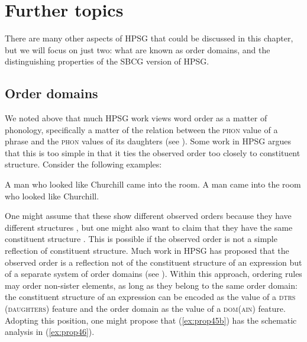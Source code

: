 \documentclass[output=paper
	        ,collection
	        ,collectionchapter
 	        ,biblatex
                ,babelshorthands
                ,newtxmath
                ,draftmode
                ,colorlinks, citecolor=brown
]{langscibook}
\begin{document}
\section{Further topics}\label{sec:prop7}
\label{prop:sec-further-topics}

There are many other aspects of HPSG that could be discussed in this chapter, but we will focus on just two: what are known as order domains, and the distinguishing properties of the SBCG version of HPSG.

\subsection{Order domains}\label{sec:prop7.1}

We noted above that much HPSG work views word order as a matter of phonology, specifically a matter of the relation between the \textsc{phon} value of a phrase and the \textsc{phon} values of its daughters (see ). Some work in HPSG argues that this is too simple in that it ties the observed order too closely to constituent structure. Consider the following examples:

\eal\label{ex:prop45}
\ex\label{ex:prop45a}
A man who looked like Churchill came into the room.
\ex\label{ex:prop45b}
A man came into the room who looked like Churchill.
\zl

\noindent
One might assume that these show different observed orders because they have different structures
\citep{Kiss2005a}, but one might also want to claim that they have the same constituent structure
\citep{KP95a}. This is possible if the observed order is not a simple reflection of constituent
structure. Much work in HPSG has proposed that the observed order is a reflection not of the
constituent structure of an expression but of a separate system of order domains (see
\citealp{Reape94a,Babel,Kathol2000a}). Within this approach, ordering rules may order non-sister
elements, as long as they belong to the same order domain: the constituent structure of an
expression can be encoded as the value of a \textsc{dtrs (daughters)} feature and the order domain
as the value of a \textsc{dom(ain)} feature. Adopting this position, one might propose that
(\ref{ex:prop45b}) has the schematic analysis in (\ref{ex:prop46}). 

\ea\label{ex:prop46}
\z
\end{document}
